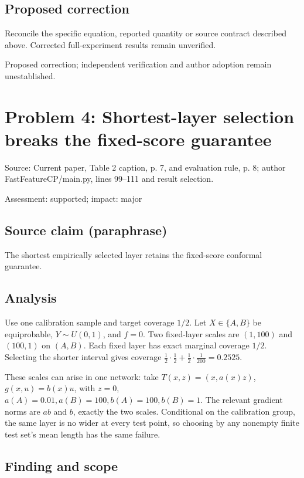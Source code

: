 \documentclass[11pt]{article}
\begin{document}
\subsection*{Proposed correction}

Reconcile the specific equation, reported quantity or source contract described above. Corrected full-experiment results remain unverified.

Proposed correction; independent verification and author adoption remain unestablished.

\section*{Problem 4: Shortest-layer selection breaks the fixed-score guarantee}

Source: Current paper, Table 2 caption, p. 7, and evaluation rule, p. 8; author FastFeatureCP/main.py, lines 99–111 and result selection.

Assessment: supported; impact: major

\subsection*{Source claim (paraphrase)}

The shortest empirically selected layer retains the fixed-score conformal guarantee.

\subsection*{Analysis}

Use one calibration sample and target coverage \(1/2\). Let \(X\in\{A,B\}\) be equiprobable, \(Y\sim U(0,1)\), and \(f=0\). Two fixed-layer scales are \((1,100)\) and \((100,1)\) on \((A,B)\). Each fixed layer has exact marginal coverage \(1/2\). Selecting the shorter interval gives coverage \(\frac12\cdot\frac12+\frac12\cdot\frac1{200}=0.2525\).

These scales can arise in one network: take \(T(x,z)=(x,a(x)z)\), \(g(x,u)=b(x)u\), with \(z=0\), \(a(A)=0.01,a(B)=100,b(A)=100,b(B)=1\). The relevant gradient norms are \(ab\) and \(b\), exactly the two scales. Conditional on the calibration group, the same layer is no wider at every test point, so choosing by any nonempty finite test set's mean length has the same failure.

\subsection*{Finding and scope}
\end{document}
